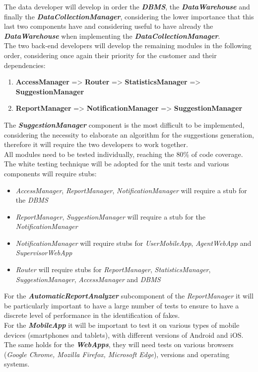 \documentclass[a4paper]{report}
\begin{document}
The data developer will develop in order the \textbf{\textit{DBMS}}, the \textbf{\textit{DataWarehouse}} and finally the \textbf{\textit{DataCollectionManager}}, considering the lower importance that this last two components have and considering useful to have already the \textbf{\textit{DataWarehouse}} when implementing the \textit{\textbf{DataCollectionManager}}.\\
The two back-end developers will develop the remaining modules in the following order, considering once again their priority for the customer and their dependencies:
\begin{enumerate}[label=\arabic*)]
\item \textbf{AccessManager} => \textbf{Router} => \textbf{StatisticsManager} => \textbf{SuggestionManager}
\item \textbf{ReportManager} => \textbf{NotificationManager}  => \textbf{SuggestionManager}
\end{enumerate}
The \textbf{\textit{SuggestionManager}} component is the most difficult to be implemented, considering the necessity to elaborate an algorithm for the suggestions generation, therefore it will require the two developers to work together.\\
All modules need to be tested individually, reaching the 80\% of code coverage. The white testing technique will be adopted for the unit tests and various components will require stubs:
\begin{itemize}
\item \textit{AccessManager}, \textit{ReportManager}, \textit{NotificationManager} will require a stub for the \textit{DBMS}
\item \textit{ReportManager}, \textit{SuggestionManager} will require a stub for the \textit{NotificationManager}
\item \textit{NotificationManager} will require stubs for \textit{UserMobileApp}, \textit{AgentWebApp} and \textit{SupervisorWebApp}
\item \textit{Router} will require stubs for \textit{ReportManager}, \textit{StatisticsManager}, \textit{SuggestionManager}, \textit{AccessManager} and \textit{DBMS}
\end{itemize}
For the \textbf{\textit{AutomaticReportAnalyzer}} subcomponent of the \textit{ReportManager} it will be particularly important to have a large number of tests to ensure to have a discrete level of performance in the identification of fakes.\\
For the \textbf{\textit{MobileApp}} it will be important to test it on various types of mobile devices (smartphones and tablets), with different versions of Android and iOS. The same holds for the \textbf{\textit{WebApps}}, they will need tests on various browsers (\textit{Google Chrome, Mozilla Firefox, Microsoft Edge}), versions and operating systems.
\end{document}
